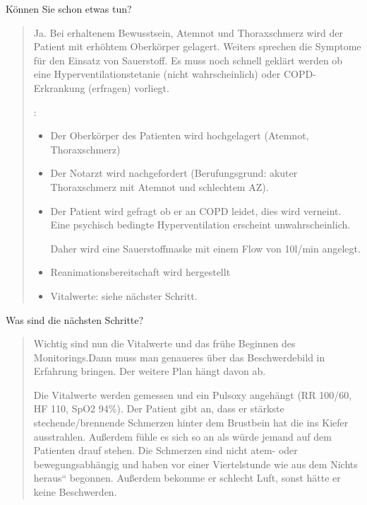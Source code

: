 Können Sie schon etwas tun?

\begin{quote}
  \marginlabel{\TxMassVit}Ja.  Bei erhaltenem Bewusstsein, Atemnot und
  Thoraxschmerz wird der Patient mit erhöhtem Oberkörper gelagert. Weiters sprechen
  die Symptome für den Einsatz von Sauerstoff. Es muss noch schnell geklärt werden
  ob eine Hyperventilationstetanie (nicht wahrscheinlich) oder COPD-Erkrankung
  (erfragen) vorliegt.
  
  \TxMassVit:
  
  \begin{itemize}
    \item Der Oberkörper des Patienten wird hochgelagert (Atemnot,
    Thoraxschmerz)
    \item Der Notarzt wird nachgefordert (Berufungsgrund: akuter
    Thoraxschmerz mit Atemnot und schlechtem AZ).
    \item Der Patient wird gefragt ob er an COPD leidet, dies wird verneint.
    Eine psychisch bedingte Hyperventilation erscheint unwahrscheinlich.
    
    Daher wird eine Sauerstoffmaske mit einem Flow von 10l/min angelegt.
    \item Reanimationsbereitschaft wird hergestellt
    \item Vitalwerte: siehe nächster Schritt.
  \end{itemize}
  
\end{quote}


Was sind die n\"achsten Schritte?

\begin{quote}
  Wichtig sind
  nun die Vitalwerte und das frühe Beginnen des Monitorings.Dann muss man
  genaueres über das Beschwerdebild in Erfahrung bringen. Der weitere Plan h\"angt davon ab.
  
  Die Vitalwerte werden gemessen und ein Pulsoxy angeh\"angt (RR 100/60,
  HF 110, SpO2 94\%). Der Patient gibt an, dass er st\"arkste
  stechende/brennende Schmerzen hinter dem Brustbein hat die ins Kiefer
  ausstrahlen. Außerdem fühle es sich so an als würde jemand auf dem
  Patienten drauf stehen. Die Schmerzen sind nicht atem- oder
  bewegungsabh\"angig  und haben vor einer Viertelstunde
  {\quotedblbase}wie aus dem Nichts heraus{\textquotedblleft} begonnen.
  Außerdem bekomme er schlecht Luft, sonst h\"atte er keine Beschwerden.
\end{quote}

